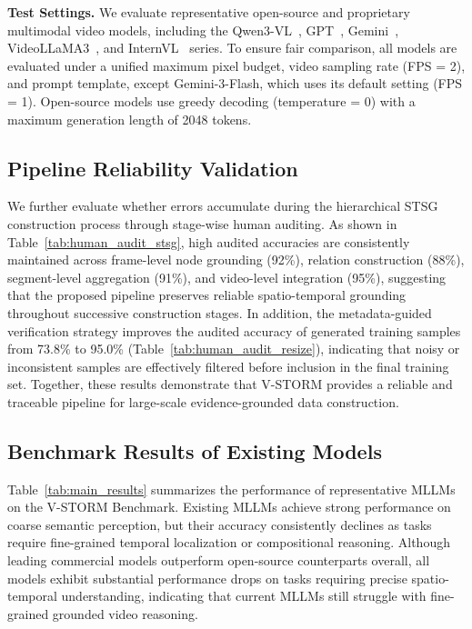 \documentclass[letterpaper]{article} %
\begin{document}
\noindent\textbf{Test Settings.}
We evaluate representative open-source and proprietary multimodal video models, including the Qwen3-VL~\cite{bai2025qwen3}, GPT~\cite{hurst2024gpt}, Gemini~\cite{team2023gemini}, VideoLLaMA3~\cite{zhang2025videollama}, and InternVL~\cite{wang2025internvl3} series. To ensure fair comparison, all models are evaluated under a unified maximum pixel budget, video sampling rate (FPS = 2), and prompt template, except Gemini-3-Flash, which uses its default setting (FPS = 1). Open-source models use greedy decoding (temperature = 0) with a maximum generation length of 2048 tokens.

\subsection{Pipeline Reliability Validation} 
We further evaluate whether errors accumulate during the hierarchical STSG construction process through stage-wise human auditing. As shown in Table~\ref{tab:human_audit_stsg}, high audited accuracies are consistently maintained across frame-level node grounding (92\%), relation construction (88\%), segment-level aggregation (91\%), and video-level integration (95\%), suggesting that the proposed pipeline preserves reliable spatio-temporal grounding throughout successive construction stages. In addition, the metadata-guided verification strategy improves the audited accuracy of generated training samples from 73.8\% to 95.0\% (Table~\ref{tab:human_audit_resize}), indicating that noisy or inconsistent samples are effectively filtered before inclusion in the final training set. Together, these results demonstrate that V-STORM provides a reliable and traceable pipeline for large-scale evidence-grounded data construction.
\subsection{Benchmark Results of Existing Models}

Table~\ref{tab:main_results} summarizes the performance of representative MLLMs on the V-STORM Benchmark. Existing MLLMs achieve strong performance on coarse semantic perception, but their accuracy consistently declines as tasks require fine-grained temporal localization or compositional reasoning. Although leading commercial models outperform open-source counterparts overall, all models exhibit substantial performance drops on tasks requiring precise spatio-temporal understanding, indicating that current MLLMs still struggle with fine-grained grounded video reasoning.
\end{document}
